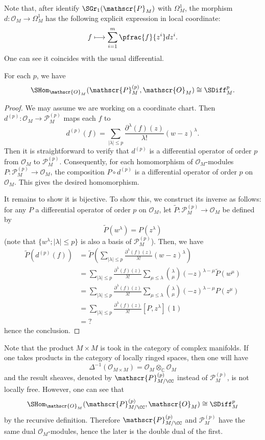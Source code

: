 Note that, after identify $\SGr_1(\mathscr{P}_M)$ with 
$\Omega_{M}^1$, the morphism $d\colon\mathscr{O}_M\to\Omega_{M}^1$ has the following 
explicit expression in local coordinate:
\[
f\longmapsto \sum_{i=1}^m\pfrac{f}{z^i}dz^i.
\]
One can see it coincides with the usual differential.

\begin{lem}
For each $p$, we have
\[
\SHom_{\mathscr{O}_M}(\mathscr{P}_M^{(p)},\mathscr{O}_M)\cong\SDiff_M^p.
\]
\end{lem}
\begin{proof}
We may assume we are working on a coordinate chart. 
Then $d^{(p)}\colon\mathscr{O}_M\to\mathscr{P}_M^{(p)}$ maps each $f$ to
\[
d^{(p)}(f)=
\sum_{|\lambda|\le p}\frac{\partial^\lambda(f)(z)}{\lambda!}(w-z)^\lambda.
\]
Then it is straightforward to verify that $d^{(p)}$ is a differential operator of order $p$ from $\mathscr{O}_M$ to $\mathscr{P}_M^{(p)}$. 
Consequently, for each homomorphism of $\mathscr{O}_M$-modules 
$P\colon\mathscr{P}_M^{(p)}\to\mathscr{O}_M$, 
the composition $P\circ d^{(p)}$ is a differential operator of order $p$ on
$\mathscr{O}_M$. This gives the desired homomorphism.
 
It remains to show it is bijective.
To show this, we construct its inverse as follows:
for any $P$ a differential operator of order $p$ on $\mathscr{O}_M$, 
let $\widetilde{P}\colon\mathscr{P}_M^{(p)}\to\mathscr{O}_M$ be defined by 
\[
\widetilde{P}(w^\lambda)=P(z^\lambda)
\]
(note that $\{w^\lambda;|\lambda|\le p\}$ is also a basis of $\mathscr{P}_M^{(p)}$). Then, we have
\begin{align*}
\widetilde{P}(d^{(p)}(f))&=\widetilde{P}
(\sum_{|\lambda|\le p}\frac{\partial^\lambda(f)(z)}{\lambda!}(w-z)^\lambda)\\
&=\sum_{|\lambda|\le p}\frac{\partial^\lambda(f)(z)}{\lambda!}
\sum_{\mu\le\lambda}\binom{\lambda}{\mu}(-z)^{\lambda-\mu}\widetilde{P}(w^\mu)\\
&=\sum_{|\lambda|\le p}\frac{\partial^\lambda(f)(z)}{\lambda!}
\sum_{\mu\le\lambda}\binom{\lambda}{\mu}(-z)^{\lambda-\mu}P(z^\mu)\\
&=\sum_{|\lambda|\le p}\frac{\partial^\lambda(f)(z)}{\lambda!}[P,z^\lambda](1)\\
&=?
\end{align*}
hence the conclusion.
\end{proof}


\begin{Rem}
Note that the product $M\times M$ is took in the category of complex manifolds. 
If one takes products in the category of locally ringed spaces, 
then one will have 
\[
\Delta^{-1}(\mathscr{O}_{M\times M})=
\mathscr{O}_M\otimes_{\mathbb{C}}\mathscr{O}_M
\]
and the result sheaves, denoted by $\mathscr{P}_{M/\CC}^{(p)}$ 
instead of $\mathscr{P}_{M}^{(p)}$, is not locally free. 
However, one can see that 
\[
\SHom_{\mathscr{O}_M}(\mathscr{P}_{M/\CC}^{(p)},\mathscr{O}_M)
\cong\SDiff_M^p
\]
by the recursive definition. 
Therefore $\mathscr{P}_{M/\CC}^{(p)}$ and $\mathscr{P}_{M}^{(p)}$ have the same 
dual $\mathscr{O}_M$-modules, hence the later is the double dual of the first.
\end{Rem}

